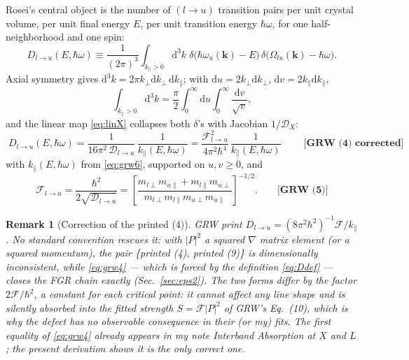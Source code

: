 \documentclass[11pt,a4paper]{article}
\numberwithin{equation}{section}
\newcommand{\hw}{\hbar\omega}
\newcommand{\cD}{\mathcal{D}}
\newcommand{\cF}{\mathcal{F}}
\newcommand{\kperp}{k_{\perp}}
\newcommand{\kpar}{k_{\parallel}}
\newcommand{\dd}{\mathrm{d}}
\newcommand{\grweq}[1]{\textbf{[GRW~(#1)]}}
\newcommand{\grwfix}[1]{\textbf{[GRW~(#1) corrected]}}
\newtheorem{remark}{Remark}[section]
\begin{document}
Rosei's central object is the number of $(l\to u)$ transition pairs
per unit crystal volume, per unit final energy $E$, per unit
transition energy $\hw$, for one half-neighborhood and one spin:
\begin{equation}
D_{l\to u}(E,\hw)\equiv\frac{1}{(2\pi)^3}
\int_{\kpar>0}\!\dd^3k\;
\delta\bigl(\hbar\omega_u(\mathbf k)-E\bigr)\,
\delta\bigl(\Omega_{lu}(\mathbf k)-\hw\bigr).
\label{eq:Ddef}
\end{equation}
Axial symmetry gives $\dd^3k=2\pi\kperp\dd\kperp\,\dd\kpar$; with
$\dd u=2\kperp\dd\kperp$, $\dd v=2\kpar\dd\kpar$,
\begin{equation}
\int_{\kpar>0}\!\dd^3k
=\frac{\pi}{2}\int_0^\infty\!\!\dd u\int_0^\infty\!\frac{\dd v}{\sqrt v},
\end{equation}
and the linear map \eqref{eq:linX} collapses both $\delta$'s with
Jacobian $1/\cD_X$:
\begin{equation}
\boxed{\;
D_{l\to u}(E,\hw)
=\frac{1}{16\pi^2\,\cD_{l\to u}}\,\frac{1}{\kpar(E,\hw)}
=\frac{\cF^2_{l\to u}}{4\pi^2\hbar^4}\,\frac{1}{\kpar(E,\hw)}
\;}\qquad\grwfix{4}
\label{eq:grw4}
\end{equation}
with $\kpar(E,\hw)$ from \eqref{eq:grw6}, supported on
$u,v\ge0$, and
\begin{equation}
\cF_{l\to u}=\frac{\hbar^2}{2\sqrt{\cD_{l\to u}}}
=\left[\frac{m_{l\perp}m_{u\parallel}+m_{l\parallel}m_{u\perp}}
{m_{l\perp}m_{l\parallel}m_{u\perp}m_{u\parallel}}\right]^{-1/2}.
\qquad\grweq{5}
\label{eq:grw5}
\end{equation}

\begin{remark}[Correction of the printed (4)]\label{rem:eq4}
GRW print $D_{l\to u}=(8\pi^2\hbar^2)^{-1}\cF/\kpar$.  No standard
convention rescues it: with $|P|^2$ a squared $\nabla$ matrix element
(or a squared momentum), the pair \{printed (4), printed (9)\} is
dimensionally inconsistent, while
\eqref{eq:grw4} --- which is forced by the definition
\eqref{eq:Ddef} --- closes the FGR chain exactly
(Sec.~\ref{sec:eps2}).  The two forms differ by the factor
$2\cF/\hbar^2$, a \emph{constant for each critical point}: it cannot
affect any line shape and is silently absorbed into the fitted
strength $S=\cF|P|^2$ of GRW's Eq.~(10), which is why the defect has
no observable consequence in their (or my) fits.  The first equality
of \eqref{eq:grw4} already appears in my note
\emph{Interband Absorption at $X$ and $L$}; the present derivation
shows it is the only correct one.
\end{remark}
\end{document}
